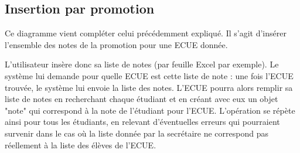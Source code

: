 \documentclass[letter, 11pt] {article}
\begin{document}
		\newpage
		
		\subsection{Insertion par promotion}
		
		Ce diagramme vient compléter celui précédemment expliqué. Il s’agit d’insérer l’ensemble des notes de la promotion pour une ECUE donnée. 
		
		L’utilisateur insère donc sa liste de notes (par feuille Excel par exemple). 
		Le système lui demande pour quelle ECUE est cette liste de note : une fois l’ECUE trouvée, le système lui envoie la liste des notes. 
		L’ECUE pourra alors remplir sa liste de notes en recherchant chaque étudiant et en créant avec eux un objet "note" qui correspond à la note de l’étudiant pour l’ECUE. L’opération se répète ainsi pour tous les étudiants, en relevant d’éventuelles erreurs qui pourraient survenir dans le cas où la liste donnée par la secrétaire ne correspond pas réellement à la liste des élèves de l’ECUE.
		
\end{document}
